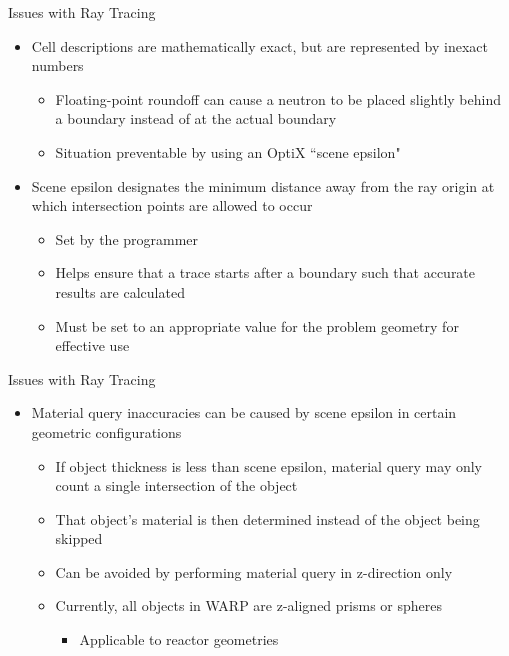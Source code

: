 \documentclass[xcolor=x11names,compress, handout]{beamer}
\renewcommand{\(}{\begin{columns}}
\renewcommand{\)}{\end{columns}}
\newcommand{\<}[1]{\begin{column}{#1}}
\renewcommand{\>}{\end{column}}
\begin{document}
\begin{frame}{Issues with Ray Tracing \cite{warp}}
	\begin{itemize}
	\pause
	\item{Cell descriptions are mathematically exact, but are represented by inexact numbers}
		\begin{itemize}
		\pause
		\item{Floating-point roundoff can cause a neutron to be placed slightly behind a boundary
		instead of at the actual boundary}
		\pause
		\item{Situation preventable by using an OptiX ``scene epsilon" }
		\end{itemize}
	\pause
	\item{Scene epsilon designates the minimum distance away from the ray origin at which 
	intersection points are allowed to occur}
		\begin{itemize}
		\pause
		\item{Set by the programmer}
		\pause
		\item{Helps ensure that a trace starts after a boundary such that accurate results are
		calculated}
		\pause
		\item{Must be set to an appropriate value for the problem geometry for effective use}
		\end{itemize}
	\end{itemize}
\end{frame}


\begin{frame}{Issues with Ray Tracing \cite{warp}}
	\begin{itemize}
	\pause
	\item{Material query inaccuracies can be caused by scene epsilon in certain geometric 
	configurations}
		\begin{itemize}
		\pause
		\item{If object thickness is less than scene epsilon, material query may only count a
		single intersection of the object}
		\pause
		\item{That object's material is then determined instead of the object being skipped}
		\pause
		\item{Can be avoided by performing material query in z-direction only}
		\pause
		\item{Currently, all objects in WARP are z-aligned prisms or spheres}
			\begin{itemize}
			\pause
			\item{Applicable to reactor geometries}
			\end{itemize}
		\end{itemize}
	\end{itemize}
\end{frame}
\end{document}
